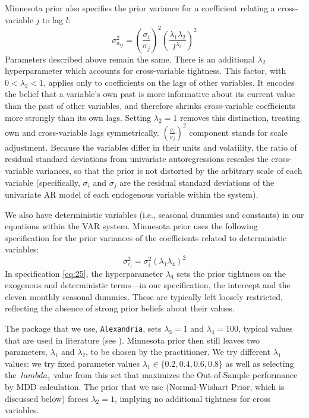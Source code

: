 \documentclass[12pt, a4paper]{article}
\begin{document}
Minnesota prior also specifies the prior variance for a coefficient relating a cross-variable $j$ to lag $l$:
\begin{equation} \label{eq:25}
\sigma_{a_{ij}}^2 = \left( \frac{\sigma_i}{\sigma_j} \right)^2 \left( \frac{\lambda_1 \lambda_2}{l^{\lambda_3}} \right)^2
\end{equation}
Parameters described above remain the same. There is an additional $\lambda_2$ hyperparameter which accounts for cross-variable tightness. This factor, with $0 < \lambda_2 < 1$, applies only to coefficients on the lags of other variables. It encodes the belief that a variable's own past is more informative about its current value than the past of other variables, and therefore shrinks cross-variable coefficients more strongly than its own lags. Setting $\lambda_2 = 1$ removes this distinction, treating own and cross-variable lags symmetrically. $\left( \frac{\sigma_i}{\sigma_j} \right)^2$ component stands for scale adjustment. Because the variables differ in their units and volatility, the ratio of residual standard deviations from univariate autoregressions rescales the cross-variable variances, so that the prior is not distorted by the arbitrary scale of each variable (specifically, $\sigma_i$ and $\sigma_j$ are the residual standard deviations of the univariate AR model of each endogenous variable within the system).

We also have deterministic variables (i.e., seasonal dummies and constants) in our equations within the VAR system. Minnesota prior uses the following specification for the prior variances of the coefficients related to deterministic variables:
\begin{equation} \label{eq:26}
\sigma_{c_i}^2 = \sigma_i^2(\lambda_1 \lambda_4)^2
\end{equation}
In specification \eqref{eq:25}, the hyperparameter $\lambda_4$ sets the prior tightness on the exogenous and deterministic terms—in our specification, the intercept and the eleven monthly seasonal dummies. These are typically left loosely restricted, reflecting the absence of strong prior beliefs about their values.

The package that we use, \texttt{Alexandria}, sets $\lambda_3 = 1$ and $\lambda_4 = 100$, typical values that are used in literature (see \citet{dieppeBEARToolbox2016,alexandria}). Minnesota prior then still leaves two parameters, $\lambda_1$ and $\lambda_2$, to be chosen by the practitioner. We try different $\lambda_1$ values: we try fixed parameter values $\lambda_1 \in \{0.2, 0.4, 0.6, 0.8\}$ as well as selecting the $\ lambda_1$ value from this set that maximizes the Out-of-Sample performance by MDD calculation. The prior that we use (Normal-Wishart Prior, which is discussed below) forces $\lambda_2 = 1$, implying no additional tightness for cross variables.
\end{document}

